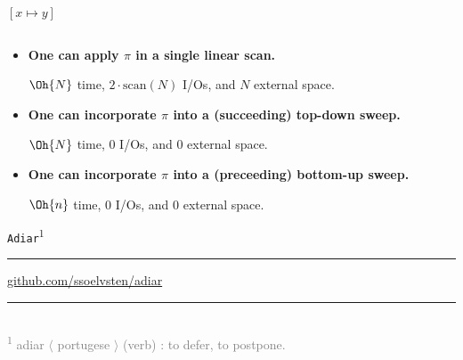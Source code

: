 \documentclass[english, aspectratio=169]{beamer}
\newcommand{\scan}[1]{\text{scan}(#1)}
\begin{document}
\begin{frame}[t]{$[x \mapsto y]$}
{\begin{columns}
\begin{column}{0.25\textwidth}
      \end{column}
    \end{columns}
  }%
   {
    \begin{itemize}
    \item {\bf One can apply $\pi$ in a single linear scan.}

      $\Oh{N}$ time, $2 \cdot \scan{N}$ I/Os, and $N$ external space.

    \item {\bf One can incorporate $\pi$ into a (succeeding) top-down sweep.}

      $\Oh{N}$ time, $0$ I/Os, and $0$ external space.

    \item {\bf One can incorporate $\pi$ into a (preceeding) bottom-up sweep.}

      $\Oh{n}$ time, $0$ I/Os, and $0$ external space.
    \end{itemize}
  }
\end{frame}

%
%
\blankframe
\begin{frame}{}
  \vspace{60pt}

  \begin{center}
    {\fontsize{42}{50}\selectfont \texttt{Adiar}\textsuperscript{\normalsize 1}}

    \rule{180pt}{0.6pt}

    {
      \href{http://github.com/ssoelvsten/adiar}{github.com/ssoelvsten/adiar}
    }
  \end{center}

  \vspace{40pt}

  \textcolor{gray}{
    \rule{150pt}{0.6pt}
  }\\
  \textcolor{gray}{\footnotesize \textsuperscript{1}
    adiar $\langle$ portugese $\rangle$ (verb) : to defer, to postpone.
  }
\end{frame}
\end{document}
